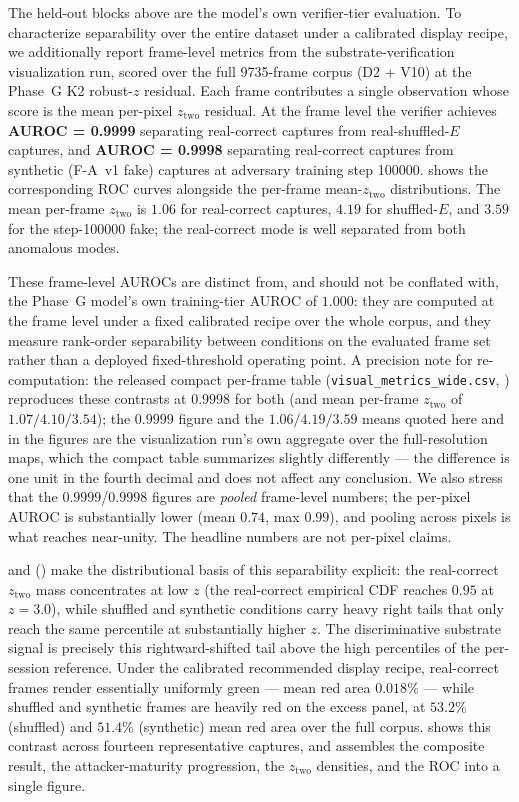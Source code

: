 The held-out blocks above are the model's own verifier-tier evaluation. To
characterize separability over the entire dataset under a calibrated display
recipe, we additionally report frame-level metrics from the substrate-verification
visualization run, scored over the full \num{9735}-frame corpus (D2 + V10) at the
Phase~G K2 robust-$z$ residual. Each frame contributes a single observation whose
score is the mean per-pixel $z_{\text{two}}$ residual. At the frame level the
verifier achieves \textbf{AUROC = 0.9999} separating real-correct captures from
real-shuffled-$E$ captures, and \textbf{AUROC = 0.9998} separating real-correct
captures from synthetic (F-A~v1 fake) captures at adversary training step
\num{100000}.  shows the corresponding ROC curves alongside the
per-frame mean-$z_{\text{two}}$ distributions. The mean per-frame
$z_{\text{two}}$ is $1.06$ for real-correct captures, $4.19$ for shuffled-$E$,
and $3.59$ for the step-\num{100000} fake; the real-correct mode is well separated
from both anomalous modes.

These frame-level AUROCs are distinct from, and should not be conflated with, the
Phase~G model's own training-tier AUROC of $1.000$: they are computed at the
frame level under a fixed calibrated recipe over the whole corpus, and they
measure rank-order separability between conditions on the evaluated frame set
rather than a deployed fixed-threshold operating point. A precision note for
re-computation: the released compact per-frame table
(\texttt{visual\_metrics\_wide.csv}, ) reproduces
these contrasts at $0.9998$ for both (and mean per-frame $z_{\text{two}}$ of
$1.07/4.10/3.54$); the $0.9999$ figure and the $1.06/4.19/3.59$ means quoted
here and in the figures are the visualization run's own aggregate over the
full-resolution maps, which the compact table summarizes slightly differently
--- the difference is one unit in the fourth decimal and does not affect any
conclusion. We also stress that the
$0.9999$/$0.9998$ figures are \emph{pooled} frame-level numbers; the per-pixel
AUROC is substantially lower (mean $0.74$, max $0.99$), and pooling across pixels
is what reaches near-unity. The headline numbers are not per-pixel claims.

 and  () make the
distributional basis of this separability explicit: the real-correct
$z_{\text{two}}$ mass concentrates at low $z$ (the real-correct empirical CDF
reaches $0.95$ at $z=3.0$), while shuffled and synthetic conditions carry heavy
right tails that only reach the same percentile at substantially higher $z$. The
discriminative substrate signal is precisely this rightward-shifted tail above
the high percentiles of the per-session reference. Under the calibrated recommended
display recipe, real-correct frames render essentially uniformly green --- mean
red area $0.018\%$ --- while shuffled and synthetic frames are heavily red on the
excess panel, at $53.2\%$ (shuffled) and $51.4\%$ (synthetic) mean red area over
the full corpus.  shows this contrast across fourteen
representative captures, and  assembles the composite
result, the attacker-maturity progression, the $z_{\text{two}}$ densities, and
the ROC into a single figure.

